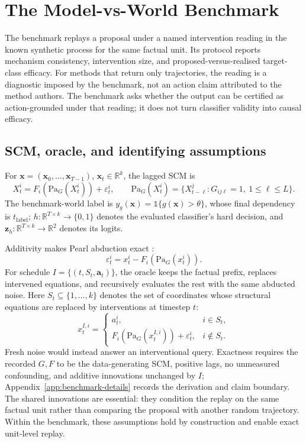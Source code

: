 \documentclass{article}
\newcommand{\R}{\mathbb{R}}
\newcommand{\bx}{\mathbf{x}}
\newcommand{\Pa}{\mathrm{Pa}}
\begin{document}
\section{The Model-vs-World Benchmark}
\label{sec:benchmark}

The benchmark replays a proposal under a named intervention reading in the known synthetic process for the same factual unit. Its protocol reports mechanism consistency, intervention size, and proposed-versus-realised target-class efficacy. For methods that return only trajectories, the reading is a diagnostic imposed by the benchmark, not an action claim attributed to the method authors. The benchmark asks whether the output can be certified as action-grounded under that reading; it does not turn classifier validity into causal efficacy.

\subsection{SCM, oracle, and identifying assumptions}

For $\bx=(\bx_0,\ldots,\bx_{T-1})$, $\bx_t\in\R^k$, the lagged SCM is
\begin{equation}
  X_t^i = F_i\!\left(\Pa_G(X_t^i)\right)+\varepsilon_t^i,
  \qquad
  \Pa_G(X_t^i)=\{X_{t-\ell}^j:G_{ij\ell}=1,\ 1\leq\ell\leq L\}.
  \label{eq:temporal-scm}
\end{equation}
The benchmark-world label is $y_g(\bx)=\mathbb{1}\{g(\bx)>\theta\}$, whose final dependency is $t_{\mathrm{label}}$; $h:\R^{T\times k}\to\{0,1\}$ denotes the evaluated classifier's hard decision, and $\mathbf{z}_h:\R^{T\times k}\to\R^2$ denotes its logits.

Additivity makes Pearl abduction exact \citep{pearl2009causality,hoyer2008anm}:
\begin{equation}
  \varepsilon_t^i
  =x_t^i-F_i\!\left(\Pa_G(x_t^i)\right).
  \label{eq:abduction}
\end{equation}
For schedule $I=\{(t,S_t,\mathbf{a}_t)\}$, the oracle keeps the factual prefix, replaces intervened equations, and recursively evaluates the rest with the same abducted noise. Here $S_t\subseteq\{1,\ldots,k\}$ denotes the set of coordinates whose structural equations are replaced by interventions at timestep $t$:
\begin{equation}
  x_t^{I,i}=
  \begin{cases}
    a_t^i, & i\in S_t,\\
    F_i\!\left(\Pa_G(x_t^{I,i})\right)+\varepsilon_t^i,
      & i\notin S_t.
  \end{cases}
  \label{eq:oracle-cf}
\end{equation}
Fresh noise would instead answer an interventional query.  Exactness requires the recorded $G,F$ to be the data-generating SCM, positive lags, no unmeasured confounding, and additive innovations unchanged by $I$; Appendix~\ref{app:benchmark-details} records the derivation and claim boundary. The shared innovations are essential: they condition the replay on the same factual unit rather than comparing the proposal with another random trajectory. Within the benchmark, these assumptions hold by construction and enable exact unit-level replay.
\end{document}
